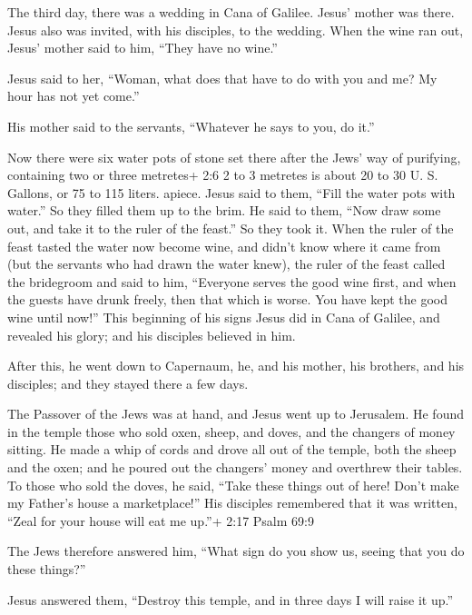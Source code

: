  The third day, there was a wedding in Cana of Galilee.
Jesus' mother was there.  Jesus also was invited, with his
disciples, to the wedding.  When the wine ran out, Jesus'
mother said to him, ``They have no wine.''

 Jesus said to her, ``Woman, what does that have to do with
you and me? My hour has not yet come.''

 His mother said to the servants, ``Whatever he says to you,
do it.''

 Now there were six water pots of stone set there after the
Jews' way of purifying, containing two or three metretes+ 2:6 2 to 3
metretes is about 20 to 30 U. S. Gallons, or 75 to 115 liters. apiece.
 Jesus said to them, ``Fill the water pots with water.'' So
they filled them up to the brim.  He said to them, ``Now
draw some out, and take it to the ruler of the feast.'' So they took it.
 When the ruler of the feast tasted the water now become
wine, and didn't know where it came from (but the servants who had drawn
the water knew), the ruler of the feast called the bridegroom
 and said to him, ``Everyone serves the good wine first,
and when the guests have drunk freely, then that which is worse. You
have kept the good wine until now!''  This beginning of his
signs Jesus did in Cana of Galilee, and revealed his glory; and his
disciples believed in him.

 After this, he went down to Capernaum, he, and his mother,
his brothers, and his disciples; and they stayed there a few days.

 The Passover of the Jews was at hand, and Jesus went up to
Jerusalem.  He found in the temple those who sold oxen,
sheep, and doves, and the changers of money sitting.  He
made a whip of cords and drove all out of the temple, both the sheep and
the oxen; and he poured out the changers' money and overthrew their
tables.  To those who sold the doves, he said, ``Take these
things out of here! Don't make my Father's house a marketplace!''
 His disciples remembered that it was written, ``Zeal for
your house will eat me up.''+ 2:17 Psalm 69:9

 The Jews therefore answered him, ``What sign do you show
us, seeing that you do these things?''

 Jesus answered them, ``Destroy this temple, and in three
days I will raise it up.''

